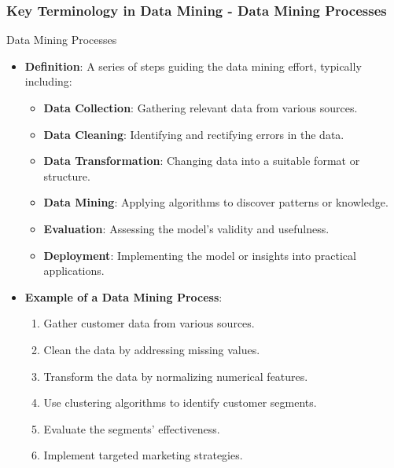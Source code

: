 \documentclass{beamer}
\begin{document}
\begin{frame}[fragile]
    \frametitle{Key Terminology in Data Mining - Data Mining Processes}
    \begin{block}{Data Mining Processes}
        \begin{itemize}
            \item \textbf{Definition}: A series of steps guiding the data mining effort, typically including:
                \begin{itemize}
                    \item \textbf{Data Collection}: Gathering relevant data from various sources.
                    \item \textbf{Data Cleaning}: Identifying and rectifying errors in the data.
                    \item \textbf{Data Transformation}: Changing data into a suitable format or structure.
                    \item \textbf{Data Mining}: Applying algorithms to discover patterns or knowledge.
                    \item \textbf{Evaluation}: Assessing the model's validity and usefulness.
                    \item \textbf{Deployment}: Implementing the model or insights into practical applications.
                \end{itemize}
            \item \textbf{Example of a Data Mining Process}:
                \begin{enumerate}
                    \item Gather customer data from various sources.
                    \item Clean the data by addressing missing values.
                    \item Transform the data by normalizing numerical features.
                    \item Use clustering algorithms to identify customer segments.
                    \item Evaluate the segments' effectiveness.
                    \item Implement targeted marketing strategies.
                \end{enumerate}
        \end{itemize}
    \end{block}
\end{frame}
\end{document}
